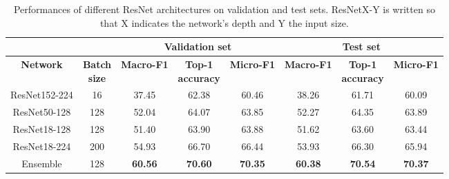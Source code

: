\begin{table}[htbp]
  \centering
  \normalsize
  \caption[Performances of different ResNet architectures on validation and test sets]{Performances of different ResNet architectures on validation and test sets. ResNetX-Y is written so that X indicates the network’s depth and Y the input size.}
  \label{table1.3}
    \begin{tabular}{*{2}{c}|*{3}{c}|*{3}{c}}
        \toprule
        \multicolumn{2}{c}{\textbf{}}                      & \multicolumn{3}{c}{\textbf{Validation set}}                     & \multicolumn{3}{c}{\textbf{Test set}}                           \\ \midrule
        \textbf{Network} & \makecell{\textbf{Batch} \\ \textbf{size}} & \textbf{Macro-F1} & \makecell{\textbf{Top-1} \\ \textbf{accuracy}} & \textbf{Micro-F1} & \textbf{Macro-F1} & \makecell{\textbf{Top-1} \\ \textbf{accuracy}} & \textbf{Micro-F1} \\
        \midrule
        ResNet152-224                & 16                  & 37.45             & 62.38                   & 60.46             & 38.26             & 61.71                   & 60.09             \\
        ResNet50-128                 & 128                 & 52.04             & 64.07                   & 63.85             & 52.27             & 64.35                   & 63.89             \\
        ResNet18-128                 & 128                 & 51.40             & 63.90                   & 63.88             & 51.62             & 63.60                   & 63.44             \\
        ResNet18-224                 & 200                 & 54.93             & 66.70                   & 66.44             & 53.93             & 66.30                   & 65.94             \\
        Ensemble                     & 128                 & \textbf{60.56}    & \textbf{70.60}          & \textbf{70.35}    & \textbf{60.38}    & \textbf{70.54}          & \textbf{70.37}    \\ \bottomrule
    \end{tabular}
\end{table}

